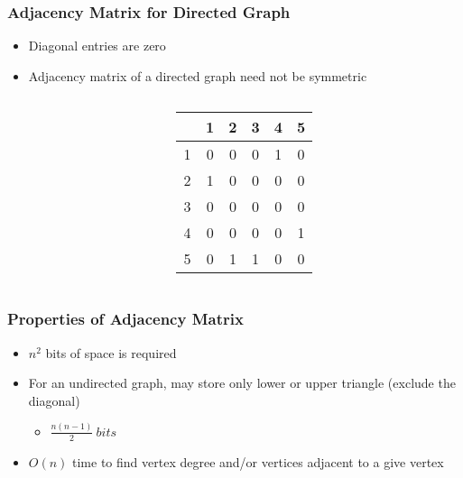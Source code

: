 \documentclass[newPxFont,sthlmFooter,nooffset]{beamer}
\begin{document}
\begin{frame}[t]
  \frametitle{Adjacency Matrix for Directed Graph}
  \begin{itemize}
  \item Diagonal entries are zero
  \item Adjacency matrix of a directed graph need not be symmetric
  \end{itemize}
    \begin{columns}
      \begin{column}{0.4\textwidth}
      \end{column}
      \begin{column}{0.4\textwidth}
\begin{tabular}{c | c c c c c }
  ~ & 1 & 2 & 3 & 4 & 5 \\ \hline
  1 & \cellcolor{blue!25}0 & 0 & 0 & 1 & 0 \\ 
  2 & 1 & \cellcolor{blue!25}0 & 0 & 0 & 0 \\
  3 & 0 & 0 & \cellcolor{blue!25}0 & 0 & 0 \\
  4 & 0 & 0 & 0 & \cellcolor{blue!25}0 & 1 \\
  5 & 0 & 1 & 1 & 0 & \cellcolor{blue!25}0 
\end{tabular}        
      \end{column}
    \end{columns}
\end{frame}


\begin{frame}[t]
  \frametitle{Properties of Adjacency Matrix}
  \begin{itemize}
  \item $n^2$ bits of space is required
  \item For an undirected graph, may store only lower or upper triangle (exclude the diagonal)
    \begin{itemize}
    \item $\frac{n(n-1)}{2}~bits$
    \end{itemize}
  \item $O(n)$ time to find vertex degree and/or vertices adjacent to a give vertex
  \end{itemize}
\end{frame}
\end{document}
